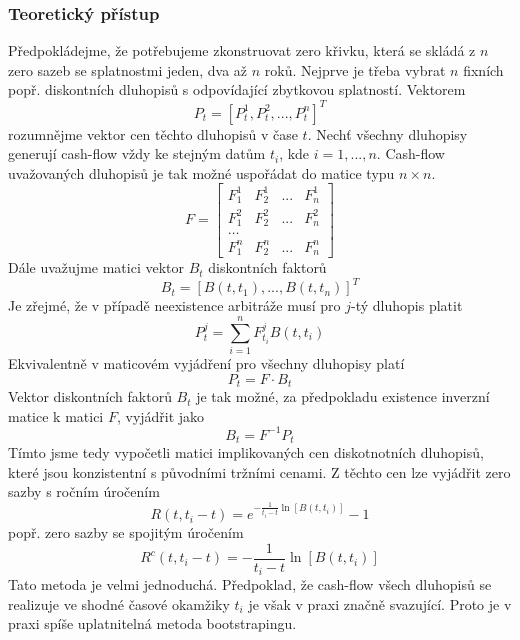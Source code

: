 \documentclass[a4paper]{book}
\begin{document}
\subsubsection{Teoretický přístup}

Předpokládejme, že potřebujeme zkonstruovat zero křivku, která se skládá z $n$ zero sazeb se splatnostmi jeden, dva až $n$ roků. Nejprve je třeba vybrat $n$ fixních popř. diskontních dluhopisů s odpovídající zbytkovou splatností. Vektorem
\begin{equation*}
P_t = [P_t^1, P_t^2, ..., P_t^n]^T
\end{equation*}
rozumnějme vektor cen těchto dluhopisů v čase $t$. Nechť všechny dluhopisy generují cash-flow vždy ke stejným datům $t_i$, kde $i = 1, ..., n$. Cash-flow uvažovaných dluhopisů je tak možné uspořádat do matice typu $n \times n$.
\begin{equation*}
F = \begin{bmatrix} F^1_1 & F^1_2 & ... & F^1_n \\ F^2_1 & F^2_2 & ... & F^2_n \\ \dots \\ F^n_1 & F^n_2 & ... & F^n_n \end{bmatrix}
\end{equation*}
Dále uvažujme matici vektor $B_t$ diskontních faktorů
\begin{equation*}
B_t = [B(t, t_1), ..., B(t, t_n)]^T
\end{equation*}
Je zřejmé, že v případě neexistence arbitráže musí pro $j$-tý dluhopis platit
\begin{equation*}
P_t^j = \sum_{i=1}^n F^j_{t_i} B(t, t_i)
\end{equation*}
Ekvivalentně v maticovém vyjádření pro všechny dluhopisy platí
\begin{equation*}
P_t = F \cdot B_t
\end{equation*}
Vektor diskontních faktorů $B_t$ je tak možné, za předpokladu existence inverzní matice k matici $F$, vyjádřit jako
\begin{equation*}
B_t = F^{-1} P_t
\end{equation*}
Tímto jsme tedy vypočetli matici implikovaných cen diskotnotních dluhopisů, které jsou konzistentní s původními tržními cenami. Z těchto cen lze vyjádřit zero sazby s ročním úročením
\begin{equation*}
R(t, t_i - t) = e^{-\frac{1}{t_i - t} \ln[B(t, t_i)]}-1
\end{equation*}
popř. zero sazby se spojitým úročením
\begin{equation*}
R^c(t, t_i - t) = - \frac{1}{t_i - t} \ln[B(t, t_i)]
\end{equation*}
Tato metoda je velmi jednoduchá. Předpoklad, že cash-flow všech dluhopisů se realizuje ve shodné časové okamžiky $t_i$ je však v praxi značně svazující. Proto je v praxi spíše uplatnitelná metoda bootstrapingu.
\end{document}
